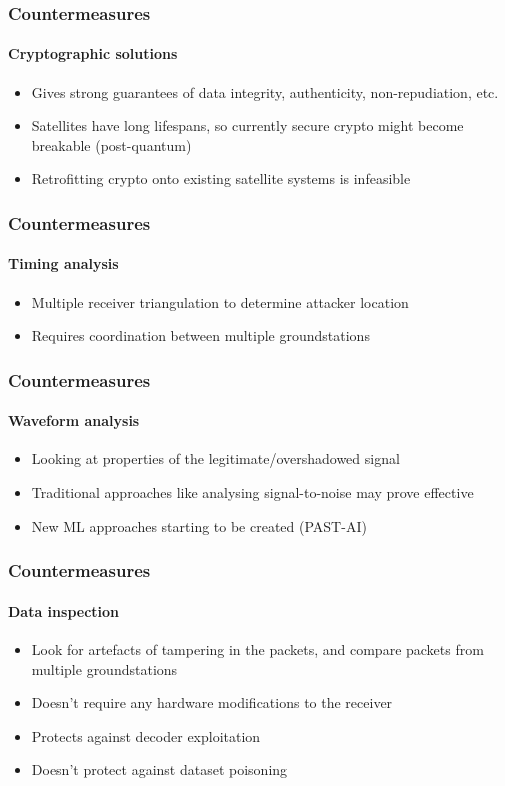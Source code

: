 \documentclass{beamer}
\begin{document}
\begin{frame}
  \frametitle{Countermeasures}
  \framesubtitle{Cryptographic solutions}
  \begin{itemize}
    \item Gives strong guarantees of data integrity, authenticity, non-repudiation, etc.
    \item Satellites have long lifespans, so currently secure crypto might become breakable (post-quantum)
    \item Retrofitting crypto onto existing satellite systems is infeasible
  \end{itemize}
\end{frame}

\begin{frame}
  \frametitle{Countermeasures}
  \framesubtitle{Timing analysis}
  \begin{itemize}
    \item Multiple receiver triangulation to determine attacker location
    \item Requires coordination between multiple groundstations
  \end{itemize}
\end{frame}

\begin{frame}
  \frametitle{Countermeasures}
  \framesubtitle{Waveform analysis}
  \begin{itemize}
    \item Looking at properties of the legitimate/overshadowed signal
    \item Traditional approaches like analysing signal-to-noise may prove effective
    \item New ML approaches starting to be created (PAST-AI)
  \end{itemize}
\end{frame}

\begin{frame}
  \frametitle{Countermeasures}
  \framesubtitle{Data inspection}
  \begin{itemize}
    \item Look for artefacts of tampering in the packets, and compare packets from multiple groundstations
    \item Doesn't require any hardware modifications to the receiver
    \item Protects against decoder exploitation
    \item Doesn't protect against dataset poisoning
  \end{itemize}
\end{frame}
\end{document}
